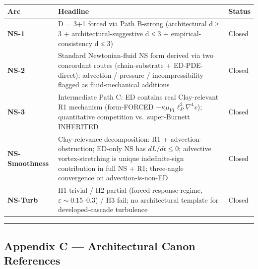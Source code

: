 \documentclass[
  11pt,a4paper]{article}
\newcounter{none} %
\begin{document}
{\def\LTcaptype{none} %
\begin{longtable}[]{@{}
  >{\raggedright\arraybackslash}p{}
  >{\raggedright\arraybackslash}p{}
  >{\raggedright\arraybackslash}p{}@{}}
\toprule\noalign{}
\begin{minipage}[b]{\linewidth}\raggedright
Arc
\end{minipage} & \begin{minipage}[b]{\linewidth}\raggedright
Headline
\end{minipage} & \begin{minipage}[b]{\linewidth}\raggedright
Status
\end{minipage} \\
\midrule\noalign{}
\endhead
\bottomrule\noalign{}
\endlastfoot
\textbf{NS-1} & D = 3+1 forced via Path B-strong (architectural d ≥ 3 +
architectural-suggestive d ≤ 3 + empirical-consistency d ≤ 3) &
Closed \\
\textbf{NS-2} & Standard Newtonian-fluid NS form derived via two
concordant routes (chain-substrate + ED-PDE-direct); advection /
pressure / incompressibility flagged as fluid-mechanical additions &
Closed \\
\textbf{NS-3} & Intermediate Path C: ED contains real Clay-relevant R1
mechanism (form-FORCED \(-\kappa\mu_{V1}\ell_P^2\nabla^4 v\));
quantitative competition vs.~super-Burnett INHERITED & Closed \\
\textbf{NS-Smoothness} & Clay-relevance decomposition: R1 +
advection-obstruction; ED-only NS has \(dL/dt \le 0\); advective
vortex-stretching is unique indefinite-sign contribution in full NS +
R1; three-angle convergence on advection-is-non-ED & Closed \\
\textbf{NS-Turb} & H1 trivial / H2 partial (forced-response regime,
\(\varepsilon \sim 0.15\)--\(0.3\)) / H3 fail; no architectural template
for developed-cascade turbulence & Closed \\
\end{longtable}
}

\begin{center}\rule{0.5\linewidth}{0.5pt}\end{center}

\subsection{Appendix C --- Architectural Canon
References}\label{appendix-c-architectural-canon-references}
\end{document}
